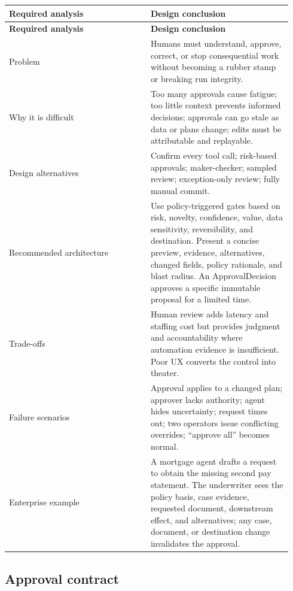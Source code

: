 \BookTableStart
\small
\begin{longtable}{@{}Y{0.4700\linewidth}Y{0.4700\linewidth}@{}}
\color{white}\bfseries \textbf{Required analysis} & \color{white}\bfseries \textbf{Design conclusion} \\
\endfirsthead
{}
\color{white}\bfseries \textbf{Required analysis} & \color{white}\bfseries \textbf{Design conclusion} \\
\endhead
Problem & Humans must understand, approve, correct, or stop consequential work without becoming a rubber stamp or breaking run integrity. \\
Why it is difficult & Too many approvals cause fatigue; too little context prevents informed decisions; approvals can go stale as data or plans change; edits must be attributable and replayable. \\
Design alternatives & Confirm every tool call; risk-based approvals; maker-checker; sampled review; exception-only review; fully manual commit. \\
Recommended architecture & Use policy-triggered gates based on risk, novelty, confidence, value, data sensitivity, reversibility, and destination. Present a concise preview, evidence, alternatives, changed fields, policy rationale, and blast radius. An ApprovalDecision approves a specific immutable proposal for a limited time. \\
Trade-offs & Human review adds latency and staffing cost but provides judgment and accountability where automation evidence is insufficient. Poor UX converts the control into theater. \\
Failure scenarios & Approval applies to a changed plan; approver lacks authority; agent hides uncertainty; request times out; two operators issue conflicting overrides; “approve all” becomes normal. \\
Enterprise example & A mortgage agent drafts a request to obtain the missing second pay statement. The underwriter sees the policy basis, case evidence, requested document, downstream effect, and alternatives; any case, document, or destination change invalidates the approval. \\
\end{longtable}
\BookTableEnd

\subsection{Approval contract}

